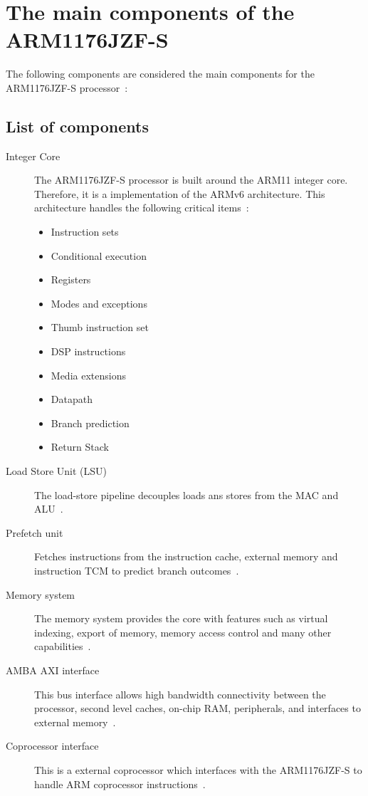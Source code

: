 \documentclass[11pt]{report}
\begin{document}
\section{The main components of the ARM1176JZF-S}
\begin{doublespace}
The following components are considered the main components for the ARM1176JZF-S processor~\citep[1-8]{arm1176jzf-s}:
\subsection{List of components}
\end{doublespace}
\begin{description}
\item[Integer Core] The ARM1176JZF-S processor is built around the ARM11 integer core. Therefore, it is a implementation of the ARMv6 architecture. This architecture handles the following critical items~\citep[1-9]{arm1176jzf-s}:
\begin{itemize}
\item Instruction sets
\item Conditional execution
\item Registers
\item Modes and exceptions
\item Thumb instruction set
\item DSP instructions
\item Media extensions
\item Datapath
\item Branch prediction
\item Return Stack
\end{itemize}
\item[Load Store Unit (LSU)] The load-store pipeline decouples loads ans stores from the MAC and ALU~\citep[1-11]{arm1176jzf-s}.
\item [Prefetch unit] Fetches instructions from the instruction cache, external memory and instruction TCM to predict branch outcomes~\citep[1-11]{arm1176jzf-s}.
\item [Memory system] The memory system provides the core with features such as virtual indexing, export of memory, memory access control and many other capabilities~\citep[1-12]{arm1176jzf-s}.
\item [AMBA AXI interface] This bus interface allows high bandwidth connectivity between the processor, second level caches, on-chip RAM, peripherals, and interfaces to external memory~\citep[1-16]{arm1176jzf-s}. 
\item [Coprocessor interface] This is a external coprocessor which interfaces with the ARM1176JZF-S to handle ARM coprocessor instructions~\citep[1-17]{arm1176jzf-s}.

\end{description}
\end{document}
